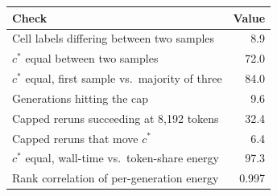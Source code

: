 \begin{tabular}{@{}lr@{}}
\toprule
Check & Value \\
\midrule
Cell labels differing between two samples & 8.9 \\
$c^*$ equal between two samples & 72.0 \\
$c^*$ equal, first sample vs.\ majority of three & 84.0 \\
Generations hitting the cap & 9.6 \\
Capped reruns succeeding at 8{,}192 tokens & 32.4 \\
Capped reruns that move $c^*$ & 6.4 \\
$c^*$ equal, wall-time vs.\ token-share energy & 97.3 \\
Rank correlation of per-generation energy & 0.997 \\
\bottomrule
\end{tabular}
